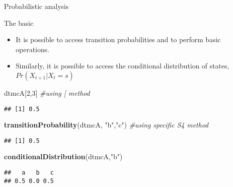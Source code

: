 \documentclass[ignorenonframetext,]{beamer}
\newenvironment{Shaded}{\begin{snugshade}}{\end{snugshade}}
\newcommand{\CommentTok}[1]{\textcolor[rgb]{0.56,0.35,0.01}{\textit{#1}}}
\newcommand{\DecValTok}[1]{\textcolor[rgb]{0.00,0.00,0.81}{#1}}
\newcommand{\KeywordTok}[1]{\textcolor[rgb]{0.13,0.29,0.53}{\textbf{#1}}}
\newcommand{\NormalTok}[1]{#1}
\newcommand{\StringTok}[1]{\textcolor[rgb]{0.31,0.60,0.02}{#1}}
\providecommand{\tightlist}{%
  \setlength{\itemsep}{0pt}\setlength{\parskip}{0pt}}
\providecommand{\tightlist}{
  \setlength{\itemsep}{0pt}\setlength{\parskip}{0pt}
}
\begin{document}
\begin{frame}[fragile]{Probabilistic analysis}
\protect\hypertarget{probabilistic-analysis}{}

\begin{block}{The basic}

\begin{itemize}
\tightlist
\item
  It is possible to access transition probabilities and to perform basic
  operations.
\item
  Similarly, it is possible to access the conditional distribution of
  states, \(Pr\left ( X_{t+1} | X_{t}=s \right )\)
\end{itemize}

\begin{Shaded}
\begin{Highlighting}[]
\NormalTok{dtmcA[}\DecValTok{2}\NormalTok{,}\DecValTok{3}\NormalTok{] }\CommentTok{#using [ method}
\end{Highlighting}
\end{Shaded}

\begin{verbatim}
## [1] 0.5
\end{verbatim}

\begin{Shaded}
\begin{Highlighting}[]
\KeywordTok{transitionProbability}\NormalTok{(dtmcA, }
                      \StringTok{"b"}\NormalTok{,}\StringTok{"c"}\NormalTok{) }\CommentTok{#using specific S4 method}
\end{Highlighting}
\end{Shaded}

\begin{verbatim}
## [1] 0.5
\end{verbatim}

\begin{Shaded}
\begin{Highlighting}[]
\KeywordTok{conditionalDistribution}\NormalTok{(dtmcA,}\StringTok{"b"}\NormalTok{)}
\end{Highlighting}
\end{Shaded}

\begin{verbatim}
##   a   b   c 
## 0.5 0.0 0.5
\end{verbatim}

\end{block}

\end{frame}
\end{document}
